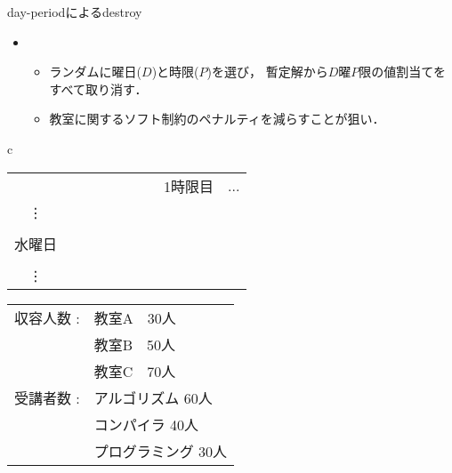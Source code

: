 \documentclass[11pt,dvipdfmx,handout]{beamer}
\begin{document}
\begin{frame}{day-periodによるdestroy}
 \begin{block}{}
 \begin{itemize}
  \item {}
   \begin{itemize}
    \item ランダムに曜日($D$)と時限($P$)を選び，
    暫定解から$D$曜$P$限の値割当てをすべて取り消す．
    \item 教室に関するソフト制約のペナルティを減らすことが狙い．
   \end{itemize}
  \end{itemize}
 \end{block}
  \begin{exampleblock}{}\scriptsize
    \begin{center}
     \begin{tabular}{c}
      \begin{minipage}{5.4cm}
       \begin{center}        
        \begin{tabular}{c|l|c}%
                     &~~~~~~~~~~~~~1時限目& ... \\\cline{1-3}
         \vdots  &                                          &   \\\cline{1-3}
                     &  \structure{教室A : アルゴリズム}     & \\
       水曜日  &  \structure{教室B : コンパイラ}         &   \\
                    &  \structure{教室C : プログラミング}   &  \\\cline{1-3}
       \vdots &                                          &  \\
        \end{tabular}
      \end{center}
     \end{minipage}    
     \begin{minipage}{4.1cm}
      \begin{center}
       \begin{tabular}{rl}%
       収容人数 : & \alert{教室A~~30人}\\
       & 教室B~~50人\\
       & 教室C~~70人\\
       受講者数 : & \alert{アルゴリズム 60人}\\
       & コンパイラ 40人\\
       & プログラミング 30人\\

\end{tabular}
\end{center}
\end{minipage}
\end{tabular}
\end{center}
\end{exampleblock}
\end{frame}
\end{document}
